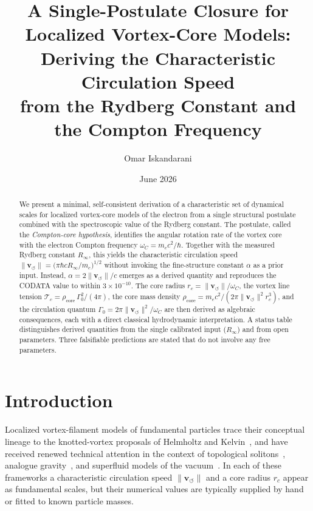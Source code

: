 \documentclass[aps,pra,preprint,longbibliography,nofootinbib]{revtex4-2}
\newcommand{\vnorm}{\lVert\mathbf{v}_{\!\boldsymbol{\circlearrowleft}}\rVert} %
\newcommand{\rhocore}{\rho_{\mathrm{core}}}      %
\newcommand{\rc}{r_c}                            %
\newcommand{\omC}{\omega_C}                      %
\newcommand{\Rinf}{R_\infty}                     %
\newcommand{\Tc}{\mathcal{T}_c}                  %
\newcommand{\Gz}{\Gamma_0}                       %
\begin{document}
\title{A Single-Postulate Closure for Localized Vortex-Core Models:\\
       Deriving the Characteristic Circulation Speed\\
       from the Rydberg Constant and the Compton Frequency}

\author{Omar Iskandarani}
\date{June 2026}

\begin{abstract}
We present a minimal, self-consistent derivation of a characteristic
set of dynamical scales for localized vortex-core models of the electron
from a single structural postulate combined with the spectroscopic value
of the Rydberg constant.
The postulate, called the \emph{Compton-core hypothesis}, identifies
the angular rotation rate of the vortex core with the electron Compton
frequency $\omC = m_e c^2/\hbar$.
Together with the measured Rydberg constant $\Rinf$, this yields the
characteristic circulation speed
$\vnorm = \bigl(\pi\hbar c\Rinf/m_e\bigr)^{1/2}$
without invoking the fine-structure constant $\alpha$ as a prior input.
Instead, $\alpha = 2\vnorm/c$ emerges as a derived quantity and
reproduces the CODATA value to within $3\times 10^{-10}$.
The core radius $\rc = \vnorm/\omC$, the vortex line tension
$\Tc = \rhocore\,\Gz^2/(4\pi)$, the core mass density
$\rhocore = m_e c^2/(2\pi\vnorm^2\rc^3)$, and the
circulation quantum $\Gz = 2\pi\vnorm^2/\omC$ are then derived
as algebraic consequences, each with a direct classical
hydrodynamic interpretation.
A status table distinguishes derived quantities from the single
calibrated input ($\Rinf$) and from open parameters.
Three falsifiable predictions are stated that do not involve
any free parameters.
\end{abstract}

\maketitle

\section{Introduction}
\label{sec:intro}

Localized vortex-filament models of fundamental particles trace their
conceptual lineage to the knotted-vortex proposals of Helmholtz and
Kelvin~\cite{Helmholtz1867,Kelvin1867}, and have received renewed
technical attention in the context of topological solitons~\cite{FaddeevNiemi1997},
analogue gravity~\cite{Barcelo2005}, and superfluid models of the
vacuum~\cite{Volovik2003}.
In each of these frameworks a characteristic circulation speed $\vnorm$
and a core radius $\rc$ appear as fundamental scales, but their
numerical values are typically supplied by hand or fitted to known
particle masses.
\end{document}
